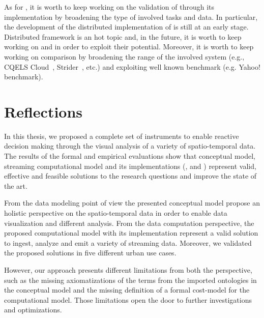 As for \frappe{}, it is worth to keep working on the validation of \river{} through its implementation by broadening the type of involved tasks and data.
In particular, the development of the distributed implementation of \river{} is still at an early stage. 
Distributed framework is an hot topic and, in the future, it is worth to keep working on \sparkdi{} and \hivedi{} in order to exploit their potential.
Moreover, it is worth to keep working on comparison by broadening the range of the involved system (e.g., CQELS Cloud~\cite{DBLP:conf/semweb/PhuocQVH13}, Strider~\cite{DBLP:conf/semweb/RenC17}, etc.) and exploiting well known benchmark (e.g. Yahoo! benchmark).

\section{Reflections}

In this thesis, we proposed a complete set of instruments to enable reactive decision making through the visual analysis of a variety of spatio-temporal data.
The results of the formal and empirical evaluations show that \frappe{} conceptual model, \river{} streaming computational model and its implementations (\sti{}, \sparkdi{} and \hivedi{}) represent valid, effective and feasible solutions to the research questions and improve the state of the art.

From the data modeling point of view the presented conceptual model propose an holistic perspective on the spatio-temporal data in order to enable data visualization and different analysis.
From the data computation perspective, the proposed computational model with its implementation represent a valid solution to ingest, analyze and emit a variety of streaming data.
Moreover, we validated the proposed solutions in five different urban use cases.

However, our approach presents different limitations from both the perspective, such as the missing axiomatizations of the terms from the imported ontologies in the conceptual model and the missing definition of a formal cost-model for the computational model.
Those limitations open the door to further investigations and optimizations.
